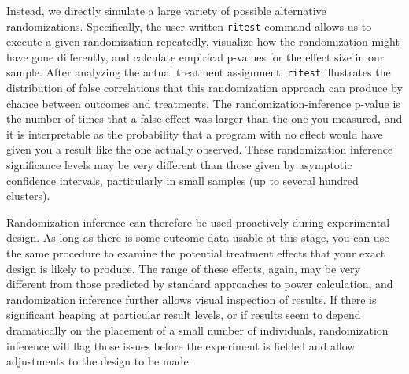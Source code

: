 Instead, we directly simulate a large variety of possible alternative randomizations.
Specifically, the user-written \texttt{ritest} command
allows us to execute a given randomization repeatedly,
visualize how the randomization might have gone differently,
and calculate empirical p-values for the effect size in our sample.
After analyzing the actual treatment assignment,
\texttt{ritest} illustrates the distribution of false correlations
that this randomization approach can produce by chance
between outcomes and treatments.
The randomization-inference p-value is the number of times
that a false effect was larger than the one you measured,
and it is interpretable as the probability that a program with no effect
would have given you a result like the one actually observed.
These randomization inference
significance levels may be very different
than those given by asymptotic confidence intervals,
particularly in small samples (up to several hundred clusters).

Randomization inference can therefore be used proactively during experimental design.
As long as there is some outcome data usable at this stage,
you can use the same procedure to examine the potential treatment effects
that your exact design is likely to produce.
The range of these effects, again, may be very different
from those predicted by standard approaches to power calculation,
and randomization inference further allows visual inspection of results.
If there is significant heaping at particular result levels,
or if results seem to depend dramatically on the placement of a small number of individuals,
randomization inference will flag those issues before the experiment is fielded
and allow adjustments to the design to be made.











